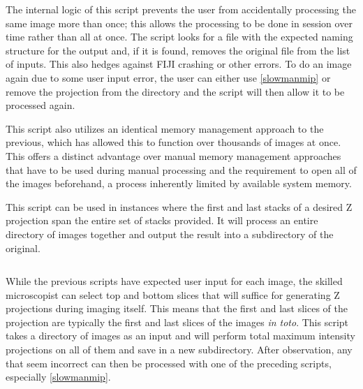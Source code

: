 The internal logic of this script prevents the user from accidentally processing the same image more than once; this allows the processing to be done in session over time rather than all at once. The script looks for a file with the expected naming structure for the output and, if it is found, removes the original file from the list of inputs. This also hedges against FIJI crashing or other errors. To do an image again due to some user input error, the user can either use \autoref{slowmanmip} or remove the projection from the directory and the script will then allow it to be processed again. 

This script also utilizes an identical memory management approach to the previous, which has allowed this to function over thousands of images at once. This offers a distinct advantage over manual memory management approaches that have to be used during manual processing and the requirement to open all of the images beforehand, a process inherently limited by available system memory.

\begin{code}
\caption{This script can be used in instances where the first and last stacks of a desired Z projection span the entire set of stacks provided. It will process an entire directory of images together and output the result into a subdirectory of the original.}
\label{bulkmip}

\inputminted[breaklines,frame=single,fontsize=\small]{python}{source/bulkMIPper.py}

\end{code}

While the previous scripts have expected user input for each image, the skilled microscopist can select top and bottom slices that will suffice for generating Z projections during imaging itself. This means that the first and last slices of the projection are typically the first and last slices of the images \textit{in toto}. This script takes a directory of images as an input and will perform total maximum intensity projections on all of them and save in a new subdirectory. After observation, any that seem incorrect can then be processed with one of the preceding scripts, especially \autoref{slowmanmip}. 

